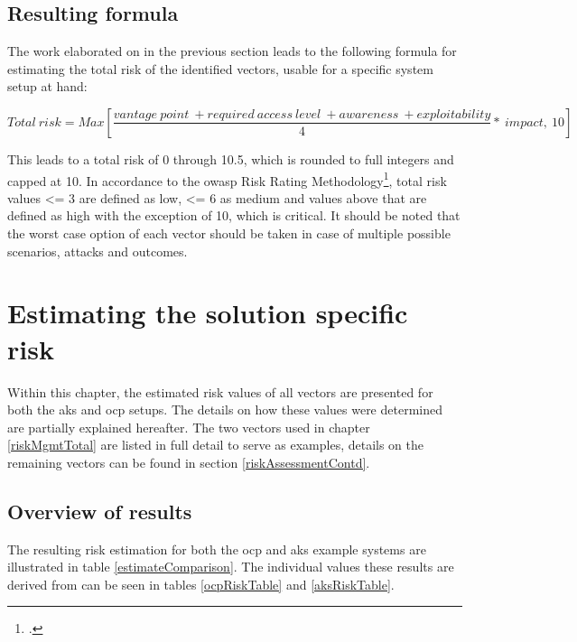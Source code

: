 \subsection{Resulting formula}
The work elaborated on in the previous section leads to the following formula for estimating the total risk of the identified vectors, usable for a specific system setup at hand:

$${Total\ risk}= Max[\frac{ {vantage\ point}\ + {required\ access\ level}\ + {awareness}\ + {exploitability} }{4}*\ impact,\ 10]$$

This leads to a total risk of 0 through 10.5, which is rounded to full integers and capped at 10. In accordance to the \gls{owasp} Risk Rating Methodology\footcite[][, section 'Step 4: Determining the Severity of the Risk']{riskRating}, total risk values <= 3 are defined as low, <= 6 as medium and values above that are defined as high with the exception of 10, which is critical.
It should be noted that the worst case option of each vector should be taken in case of multiple possible scenarios, attacks and outcomes.

\newpage
\section{Estimating the solution specific risk} \label{riskEstimate}

Within this chapter, the estimated risk values of all vectors are presented for both the \gls{aks} and \gls{ocp} setups.
The details on how these values were determined are partially explained hereafter. 
The two vectors used in chapter \ref{riskMgmtTotal} are listed in full detail to serve as examples, details on the remaining vectors can be found in section \ref{riskAssessmentContd}.

\subsection{Overview of results}

The resulting risk estimation for both the \gls{ocp} and \gls{aks} example systems are illustrated in table \ref{estimateComparison}. The individual values these results are derived from can be seen in tables \ref{ocpRiskTable} and \ref{aksRiskTable}. 

